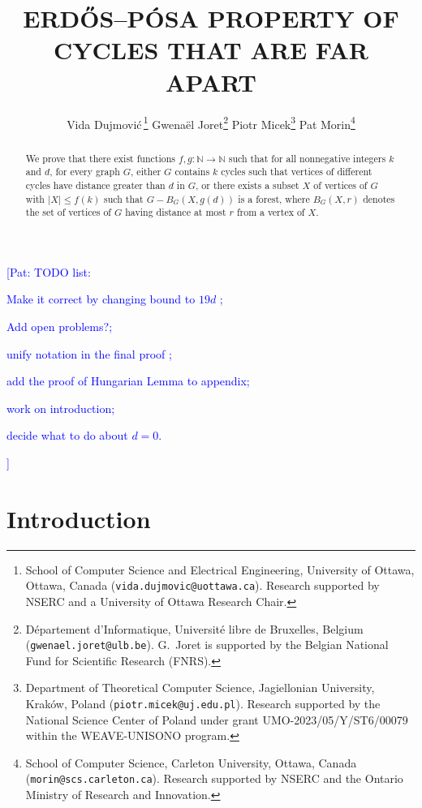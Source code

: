 \documentclass{patmorin}
\title{\MakeUppercase{{E}rdős–{P}ósa property of cycles that are far apart}}
\author{
 Vida Dujmovi{\'c}\,\footnote{School of Computer Science and Electrical Engineering, University of Ottawa, Ottawa, Canada (\texttt{vida.dujmovic@uottawa.ca}). Research supported by NSERC and a University of Ottawa Research Chair.}
 \qquad
 Gwena\"el Joret\footnote{D\'epartement d'Informatique, Universit\'e libre de Bruxelles, Belgium ({\tt gwenael.joret@ulb.be}). G.\ Joret is supported by the Belgian National Fund for Scientific Research (FNRS).}
 \qquad
 Piotr Micek\footnote{Department of Theoretical Computer Science, Jagiellonian University, Kraków, Poland (\texttt{piotr.micek@uj.edu.pl}). Research supported by the National Science Center of Poland under grant
UMO-2023/05/Y/ST6/00079 within the WEAVE-UNISONO program.}
 \qquad
 Pat Morin\footnote{School of Computer Science, Carleton University, Ottawa, Canada (\texttt{morin@scs.carleton.ca}). Research supported by NSERC and the Ontario Ministry of Research and Innovation.}}
\date{}
\newcommand{\pat}[1]{\textcolor{Blue}{[Pat: #1]}}
\begin{document}
\maketitle


\noindent
\pat{TODO list: 
\begin{enumerate*}
    \item Make it correct by changing bound to $19d$ \checkmark; 
    \item Add open problems?; 
    \item unify notation in the final proof \checkmark; 
    \item add the proof of Hungarian Lemma to appendix; 
    \item work on introduction; 
    \item decide what to do about $d=0$.
\end{enumerate*}}

\begin{abstract}
  We prove that there exist functions  $f,g:\mathbb{N}\to\mathbb{N}$ such that for all nonnegative integers $k$ and $d$,  for every graph $G$,  either $G$ contains $k$ cycles such that vertices of different cycles have distance greater than $d$ in $G$, or there exists a subset $X$ of vertices of $G$ with $|X|\leq f(k)$ such that  $G-B_G(X,g(d))$ is a forest, where $B_G(X,r)$ denotes the set of vertices of $G$ having distance at most $r$ from a vertex of $X$.
\end{abstract}



\section{Introduction}
\end{document}
